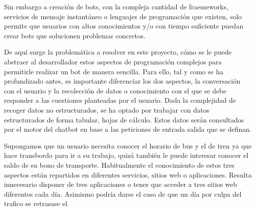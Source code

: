 Sin embargo a creación de bots, con la compleja cantidad de fraemeworks, servicios de mensaje instantáneo o lenguajes de programación que existen, solo permite que usuarios con altos conocimientos y/o con tiempo suficiente puedan crear bots que solucionen problemas concretos.

De aquí surge la problemática a resolver en este proyecto, cómo se le puede abstraer al desarrollador estos aspectos de programación complejos para permitirle realizar un bot de manera sencilla. Para ello, tal y como se ha profundizado antes, es importante diferenciar los dos aspectos, la conversación con el usuario y la recolección de datos o conocimiento con el que se debe responder a las cuestiones planteadas por el usuario. Dada la complejidad de recoger datos no estructurados, se ha optado por trabajar con datos estructurados de forma tabular, hojas de cálculo. Estos datos serán consultados por el motor del chatbot en base a las peticiones de entrada salida que se definan.	

Supongamos que un usuario necesita conocer el horario de bus y el de tren ya que hace transbordo para ir a su trabajo, quizá también le puede interesar conocer el saldo de su bono de transporte. Habitualmente el conocimiento de estos tres aspectos están repartidos en diferentes servicios, sitios web o aplicaciones. Resulta innecesario disponer de tres aplicaciones o tener que acceder a tres sitios web diferentes cada día. Asimismo podría darse el caso de que un día por culpa del trafico se retrasase el 
